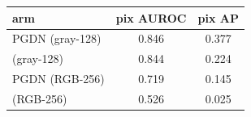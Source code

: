 \setlength{\tabcolsep}{3pt}
\begin{tabular}{@{}lcc@{}}
\toprule
arm & pix AUROC & pix AP \\
\midrule
PGDN (gray-128) & 0.846 & 0.377 \\
\draem{} (gray-128) & 0.844 & 0.224 \\
PGDN (RGB-256) & 0.719 & 0.145 \\
\draem{} (RGB-256) & 0.526 & 0.025 \\
\bottomrule
\end{tabular}
